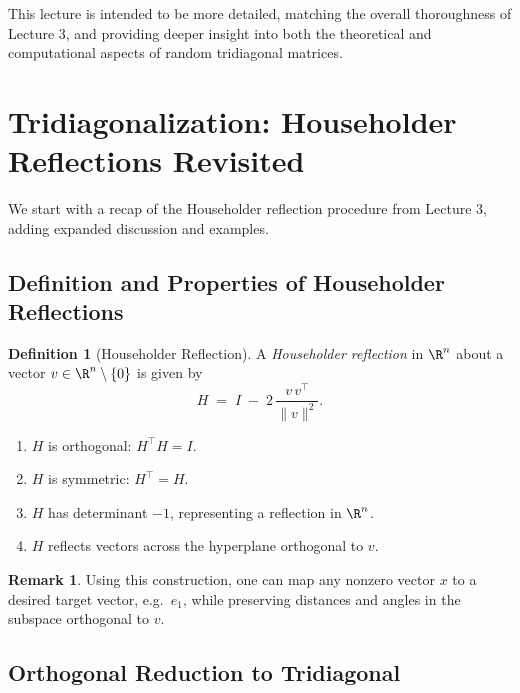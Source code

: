 \documentclass[letterpaper,11pt,oneside,reqno]{article}
\numberwithin{equation}{section}
\theoremstyle{definition}
\newtheorem{definition}[proposition]{Definition}
\newtheorem{remark}[proposition]{Remark}
\begin{document}
This lecture is intended to be more detailed, matching the overall thoroughness of Lecture 3, and providing deeper insight into both the theoretical and computational aspects of random tridiagonal matrices.

\section{Tridiagonalization: Householder Reflections Revisited}
\label{sec:householder}

We start with a recap of the Householder reflection procedure from Lecture 3, adding expanded discussion and examples.

\subsection{Definition and Properties of Householder Reflections}

\begin{definition}[Householder Reflection]
A \emph{Householder reflection} in $\R^n$ about a vector $v \in \R^n \setminus\{0\}$ is given by
\[
  H \;=\;
  I \;-\; 2\,\frac{v\,v^\top}{\|v\|^2}.
\]
\begin{enumerate}[(1)]
\item $H$ is orthogonal: $H^\top H = I$.
\item $H$ is symmetric: $H^\top = H$.
\item $H$ has determinant $-1$, representing a reflection in $\R^n$.
\item $H$ reflects vectors across the hyperplane orthogonal to $v$.
\end{enumerate}
\end{definition}

\begin{remark}
Using this construction, one can map any nonzero vector $x$ to a desired target vector, e.g.\ $e_1$, while preserving distances and angles in the subspace orthogonal to $v$.
\end{remark}

\subsection{Orthogonal Reduction to Tridiagonal}
\end{document}

